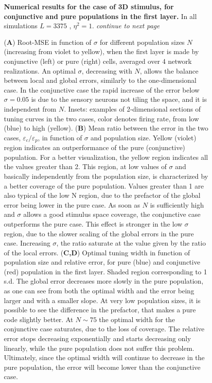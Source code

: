 \documentclass[a4paper]{article}%
\begin{document}
\begin{figure}[p]
\caption{\textbf{Numerical
results for the case of 3D stimulus, for conjunctive and pure populations in
the first layer.} In all simulations $L=3375$ , $\eta^{2} =1$.
\emph{continue to next page}}
\end{figure}\begin{figure}[t]
\captionsetup{labelformat=adja-page} \ContinuedFloat
\caption[Figure]{ (\textbf{A}) Root-MSE in function of $\sigma$ for different
population sizes $N$ (increasing from violet to yellow), when the first layer
is made by conjunctive (left) or pure (right) cells, averaged over 4 network
realizations. An optimal $\sigma$, decreasing with $N$, allows the balance
between local and global errors, similarly to the one-dimensional case. In the
conjunctive case the rapid increase of the error below $\sigma=0.05$ is due to
the sensory neurons not tiling the space, and it is independent from $N$. Insets: examples of
2-dimensional sections of tuning curves in the two cases, color denotes firing
rate, from low (blue) to high (yellow).  (\textbf{B}) Mean ratio between the
error in the two cases, $\varepsilon_{c}/\varepsilon_{p}$, in function of
$\sigma$ and population size. Yellow (violet) region indicates an
outperformance of the pure (conjunctive) population. For a better
visualization, the yellow region indicates all the values greater than 2. This
region, at low values of $\sigma$ and basically independently from the
population size, is characterized by a better coverage of the pure population.
Values greater than 1 are also typical of the low N region, due to the
prefactor of the global error being lower in the pure case. As soon as $N$ is
sufficiently high and $\sigma$ allows a good stimulus space coverage, the
conjunctive case outperforms the pure case. This effect is stronger in the low
$\sigma$ region, due to the slower scaling of the global errors in the pure
case. Increasing $\sigma$, the ratio saturate at the value given by the ratio
of the local errors. (\textbf{C,D}) Optimal tuning width in function of
population size and relative error, for pure (blue) and conjunctive (red)
population in the first layer. Shaded region corresponding to 1 s.d. The global
error decreases more slowly in the pure population, as one can see from both
the optimal width and the error being larger and with a smaller slope. At very
low population sizes, it is possible to see the difference in the prefactor,
that makes a pure code slightly better. At $N\sim75$ the optimal width for the
conjunctive case saturates, due to the loss of coverage. The relative error
stops decreasing exponentially and starts decreasing only linearly, while the
pure population does not suffer this problem.
Ultimately, since the optimal width will continue to decrease in the pure
population, the error will become lower than the conjunctive case.}
\label{Fig:5}
\end{figure}\clearpage
\end{document}
